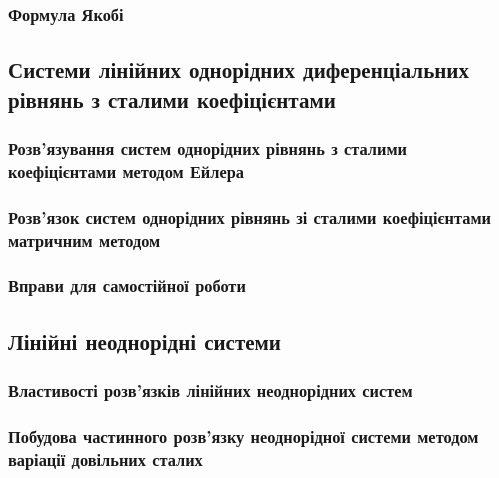 \documentclass[a4paper, 12pt]{article}
\theoremstyle{definition}
\numberwithin{equation}{section}%
\numberwithin{equation}{subsection}
\begin{document}


\subsubsection{Формула Якобі \todo}



\subsection{Системи лінійних однорідних диференціальних рівнянь з сталими коефіцієнтами \todo}



\subsubsection{Розв'язування систем однорідних рівнянь з сталими коефіцієнтами методом Ейлера \todo}



\subsubsection{Розв'язок систем однорідних рівнянь зі сталими коефіцієнтами матричним методом \todo}



\subsubsection{Вправи для самостійної роботи \todo}



\subsection{Лінійні неоднорідні системи \todo}



\subsubsection{Властивості розв'язків лінійних неоднорідних систем \todo}



\subsubsection{Побудова частинного розв'язку неоднорідної системи методом варіації довільних сталих \todo}
\end{document}
